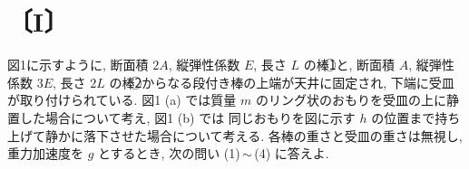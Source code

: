 
\section*{〔I〕}

図1に示すように, 断面積 $2A$, 縦弾性係数 $E$, 長さ $L$ の棒\textcircled{1}と, 断面積 $A$, 縦弾性係数 $3E$,
長さ $2L$ の棒\textcircled{2}からなる段付き棒の上端が天井に固定され, 下端に受皿が取り付けられている.
図1 (a) では質量 $m$ のリング状のおもりを受皿の上に静置した場合について考え, 図1 (b) では
同じおもりを図に示す $h$ の位置まで持ち上げて静かに落下させた場合について考える.
各棒の重さと受皿の重さは無視し, 重力加速度を $g$ とするとき, 次の問い (1)\,$\sim$\,(4) に答えよ.

